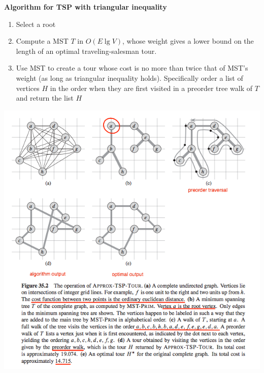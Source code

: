 \documentclass[11pt]{article}
\begin{document}
\begin{defn*}
    \textbf{Algorithm for TSP with triangular inequality}
    \begin{enumerate}
        \item Select a root 
        \item Compute a MST $T$ in $O(E\lg V)$, whose weight gives a lower bound on the length of an optimal traveling-salesman tour. 
        \item Use MST to create a tour whose cost is no more than twice that of MST's weight (as long as triangular inequality holds). Specifically order a list of vertices $H$ in the order when they are first visited in a preorder tree walk of $T$ and return the list $H$
    \end{enumerate}
    \includegraphics[width=\textwidth]{tsp.png}
\end{defn*}
\end{document}

